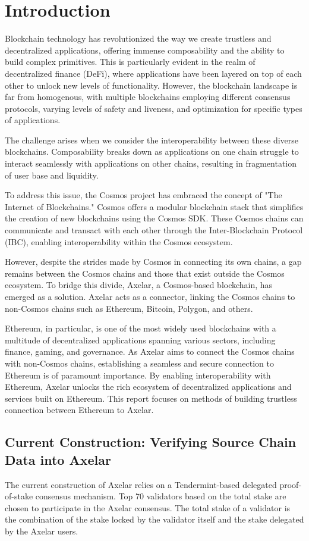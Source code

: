 \section{Introduction}
Blockchain technology has revolutionized the way we create trustless and decentralized applications, offering immense composability and the ability to build complex primitives. This is particularly evident in the realm of decentralized finance (DeFi), where applications have been layered on top of each other to unlock new levels of functionality. However, the blockchain landscape is far from homogenous, with multiple blockchains employing different consensus protocols, varying levels of safety and liveness, and optimization for specific types of applications.

The challenge arises when we consider the interoperability between these diverse blockchains. Composability breaks down as applications on one chain struggle to interact seamlessly with applications on other chains, resulting in fragmentation of user base and liquidity.

To address this issue, the Cosmos project has embraced the concept of "The Internet of Blockchains." Cosmos offers a modular blockchain stack that simplifies the creation of new blockchains using the Cosmos SDK. These Cosmos chains can communicate and transact with each other through the Inter-Blockchain Protocol (IBC), enabling interoperability within the Cosmos ecosystem.

However, despite the strides made by Cosmos in connecting its own chains, a gap remains between the Cosmos chains and those that exist outside the Cosmos ecosystem. To bridge this divide, Axelar, a Cosmos-based blockchain, has emerged as a solution. Axelar acts as a connector, linking the Cosmos chains to non-Cosmos chains such as Ethereum, Bitcoin, Polygon, and others.

Ethereum, in particular, is one of the most widely used blockchains with a multitude of decentralized applications spanning various sectors, including finance, gaming, and governance. As Axelar aims to connect the Cosmos chains with non-Cosmos chains, establishing a seamless and secure connection to Ethereum is of paramount importance. By enabling interoperability with Ethereum, Axelar unlocks the rich ecosystem of decentralized applications and services built on Ethereum. This report focuses on methods of building trustless connection between Ethereum to Axelar.

\subsection{Current Construction: Verifying Source Chain Data into Axelar}
The current construction of Axelar relies on a Tendermint-based delegated proof-of-stake consensus mechanism. Top 70 validators based on the total stake are chosen to participate in the Axelar consensus. The total stake of a validator is the combination of the stake locked by the validator itself and the stake delegated by the Axelar users.

